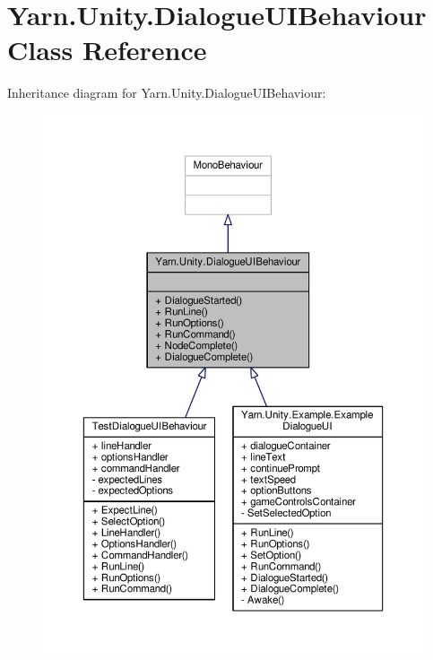 \hypertarget{a00038}{\section{Yarn.\-Unity.\-Dialogue\-U\-I\-Behaviour Class Reference}
\label{a00038}
}


Inheritance diagram for Yarn.\-Unity.\-Dialogue\-U\-I\-Behaviour\-:
\nopagebreak
\begin{figure}[H]
\begin{center}
\leavevmode
\includegraphics[width=350pt]{df/d91/a00335}
\end{center}
\end{figure}


